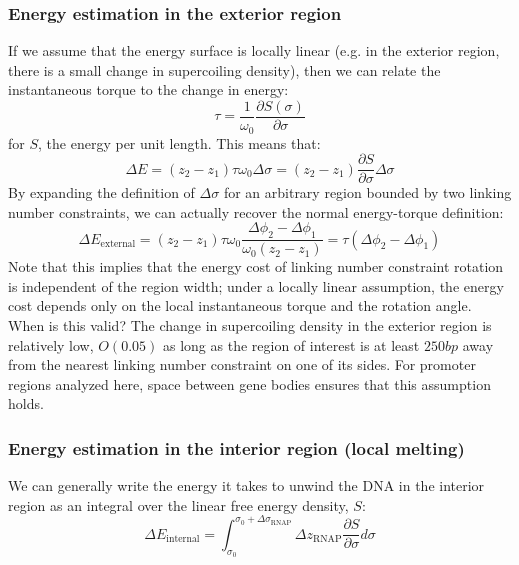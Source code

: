 \documentclass[11pt]{article} %
\begin{document}
\subsubsection{Energy estimation in the exterior region}
If we assume that the energy surface is locally linear (e.g. in the exterior region, there is a small change in supercoiling density), then we can relate the instantaneous torque to the change in energy:
\[ \tau = \frac{1}{\omega_0} \frac{\partial S(\sigma)}{\partial \sigma}\]
for \(S\), the energy per unit length. This means that:
\begin{equation}
    \Delta E = (z_2 - z_1) \tau \omega_0 \Delta \sigma = (z_2 - z_1) \frac{\partial S}{\partial \sigma} \Delta \sigma
\end{equation}
By expanding the definition of \(\Delta \sigma\) for an arbitrary region bounded by two linking number constraints, we can actually recover the normal energy-torque definition:
\begin{equation}
    \Delta E_\text{external} = (z_2 - z_1) \tau \omega_0 \frac{\Delta\phi_2 - \Delta\phi_1}{\omega_0 (z_2 - z_1)} = \tau (\Delta \phi_2 - \Delta\phi_1) \label{eq:external_de}
\end{equation}
Note that this implies that the energy cost of linking number constraint rotation is independent of the region width; under a locally linear assumption, the energy cost depends only on the local instantaneous torque and the rotation angle. When is this valid? The change in supercoiling density in the exterior region is relatively low, \(O(0.05)\) as long as the region of interest is at least \(250bp\) away from the nearest linking number constraint on one of its sides. For promoter regions analyzed here, space between gene bodies ensures that this assumption holds.

\subsubsection{Energy estimation in the interior region (local melting)}
We can generally write the energy it takes to unwind the DNA in the interior region as an integral over the linear free energy density, \(S\):
\[\Delta E_\text{internal} =  \int_{\sigma_0}^{\sigma_0 + \Delta \sigma_\text{RNAP}} \Delta z_\text{RNAP} \frac{\partial S}{\partial \sigma} d\sigma\]
\end{document}
